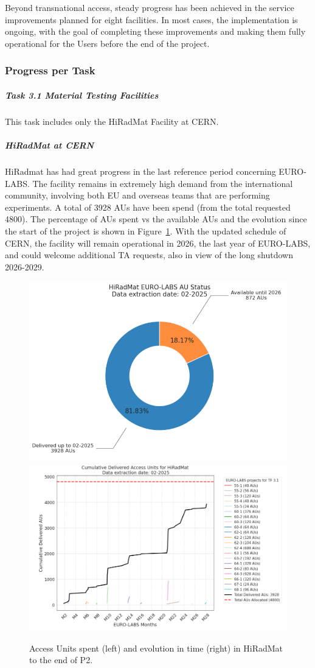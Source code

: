 Beyond transnational access, steady progress has been achieved in the service improvements planned for eight facilities. In most cases, the implementation is ongoing, with the goal of completing these improvements and making them fully operational for the Users before the end of the project.


\subsubsection*{Progress per Task}

\subparagraph{Task 3.1 Material Testing Facilities} \mbox{}

This task includes only the HiRadMat Facility at CERN. 

\subparagraph{HiRadMat at CERN}

HiRadmat has had great progress in the last reference period concerning EURO-LABS. The facility remains in extremely high demand from the international community, involving both EU and overseas teams that are performing experiments. A total of 3928 AUs have been spend (from the total requested 4800). The percentage of AUs spent vs the available AUs and the evolution since the start of the project is shown in Figure~\ref{fig:wp3-hrmt-stat}. With the updated schedule of CERN, the facility will remain operational in 2026, the last year of EURO-LABS, and could welcome additional TA requests, also in view of the long shutdown 2026-2029. 
\begin{figure}[!h]
    \centering
    \includegraphics[width=0.48\linewidth]{graphics/stat_pie_hiradmat.png}
    \includegraphics[width=0.48\linewidth]{graphics/overall_evolution_hiradmat.png}
    \caption{Access Units spent (left) and evolution in time (right) in HiRadMat to the end of P2.}
    \label{fig:wp3-hrmt-stat}
\end{figure}


